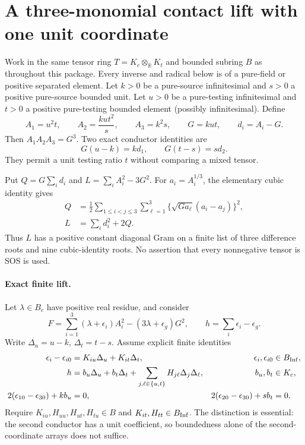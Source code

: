 \section{A three-monomial contact lift with one unit coordinate}
\label{sec:three-circuit}

Work in the same tensor ring $T=K_c\otimes_{\mathbb R}K_t$ and bounded
subring $B$ as throughout this package. Every inverse and radical below
is of a pure-field or positive separated element. Let $k>0$ be a
pure-source infinitesimal and $s>0$ a positive pure-source bounded unit.
Let $u>0$ be a pure-testing infinitesimal and $t>0$ a positive
pure-testing bounded element (possibly infinitesimal). Define
\[
 A_1=u^2t,\qquad A_2=\frac{ku t^2}{s},\qquad A_3=k^2s,
 \qquad G=kut,\qquad d_i=A_i-G.
\]
Then $A_1A_2A_3=G^3$. Two exact conductor identities are
\begin{equation}\label{T3:conductors}
 G(u-k)=k d_1,\qquad G(t-s)=s d_2.
\end{equation}
They permit a unit testing ratio $t$ without comparing a mixed tensor.

Put $Q=G\sum_i d_i$ and $L=\sum_i A_i^2-3G^2$.
For $a_i=A_i^{1/3}$, the elementary cubic identity gives
\begin{align}\label{T3:sos}
 Q&=\frac12\sum_{1\le i<j\le3}\sum_{\ell=1}^3
       \{\sqrt{G a_\ell}(a_i-a_j)\}^2,\\
 L&=\sum_i d_i^2+2Q.\nonumber
\end{align}
Thus $L$ has a positive constant diagonal Gram on a finite list of
three difference roots and nine cubic-identity roots. No assertion
that every nonnegative tensor is SOS is used.

\paragraph{Exact finite lift.}
Let $\lambda\in B_c$ have positive real residue, and consider
\[
 F=\sum_{i=1}^3(\lambda+\epsilon_i)A_i^2
       -(3\lambda+\epsilon_g)G^2,
 \qquad h=\sum_i\epsilon_i-\epsilon_g.
\]
Write $\Delta_u=u-k$, $\Delta_t=t-s$. Assume explicit finite identities
\begin{align}
 \epsilon_i-\epsilon_{i0}&=K_{iu}\Delta_u+K_{it}\Delta_t,
       &\epsilon_i,\epsilon_{i0}&\in B_{\rm Inf},\label{T3:coeff}\\
 h&=b_u\Delta_u+b_t\Delta_t+
          \sum_{j,\ell\in\{u,t\}}H_{j\ell}\Delta_j\Delta_\ell,
       &b_u,b_t&\in K_c,\label{T3:taylor}\\
 2(\epsilon_{10}-\epsilon_{30})+k b_u&=0,
 &2(\epsilon_{20}-\epsilon_{30})+s b_t&=0.\label{T3:jets}
\end{align}
Require $K_{iu},H_{uu},H_{ut},H_{tu}\in B$ and
$K_{it},H_{tt}\in B_{\rm Inf}$. The distinction is essential:
the second conductor has a unit coefficient, so boundedness alone of
the second-coordinate arrays does not suffice.

